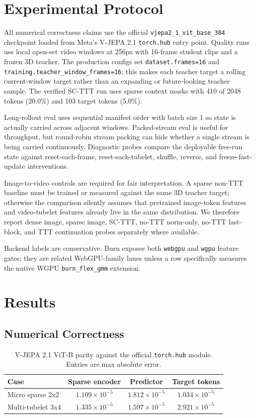 \documentclass[10pt]{article}
\begin{document}
\section{Experimental Protocol}

All numerical correctness claims use the official
\texttt{vjepa2\_1\_vit\_base\_384} checkpoint loaded from Meta's V-JEPA 2.1
\texttt{torch.hub} entry point.  Quality runs use local open-set video windows
at 256px with 16-frame student clips and a frozen 3D teacher.  The production
configs set \texttt{dataset.frames=16} and
\texttt{training.teacher\_window\_frames=16}; this makes each teacher target a
rolling current-window target rather than an expanding or future-looking
teacher sample.  The verified SC-TTT run uses sparse context masks with 410 of
2048 tokens (20.0\%) and 103 target tokens (5.0\%).

Long-rollout eval uses sequential manifest order with batch size 1 so state is
actually carried across adjacent windows.  Packed-stream eval is useful for
throughput, but round-robin stream packing can hide whether a single stream is
being carried continuously.  Diagnostic probes compare the deployable free-run
state against reset-each-frame, reset-each-tubelet, shuffle, reverse, and
freeze-fast-update interventions.

Image-to-video controls are required for fair interpretation.  A sparse
non-TTT baseline must be trained or measured against the same 3D teacher target;
otherwise the comparison silently assumes that pretrained image-token features
and video-tubelet features already live in the same distribution.  We therefore
report dense image, sparse image, SC-TTT, no-TTT norm-only, no-TTT last-block,
and TTT continuation probes separately where available.

Backend labels are conservative.  Burn exposes both \texttt{webgpu} and
\texttt{wgpu} feature gates; they are related WebGPU-family lanes unless a row
specifically measures the native WGPU \texttt{burn\_flex\_gmm} extension.

\section{Results}

\subsection{Numerical Correctness}

\begin{table}[t]
\centering
\caption{V-JEPA 2.1 ViT-B parity against the official \texttt{torch.hub}
module.  Entries are max absolute error.}
\label{tab:parity}
\begin{tabular}{lccc}
\toprule
Case & Sparse encoder & Predictor & Target tokens \\
\midrule
Micro sparse 2x2 & $1.109{\times}10^{-5}$ & $1.812{\times}10^{-5}$ & $1.034{\times}10^{-5}$ \\
Multi-tubelet 3x4 & $1.335{\times}10^{-5}$ & $1.597{\times}10^{-5}$ & $2.921{\times}10^{-5}$ \\
\bottomrule
\end{tabular}
\end{table}
\end{document}
